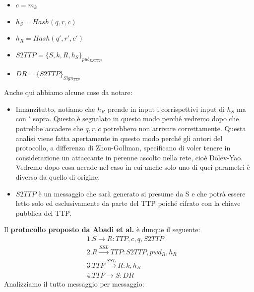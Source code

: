 \begin{itemize}
    \item $c= m_k$ 
    \item $h_S = Hash(q,r,c)$
    \item $h_R = Hash(q',r',c')$
    \item $S2TTP = \{S,k,R,h_S\}_{pub_{EK TTP}}$
    \item $DR = \{S2TTP\}_{Sign_{TTP}}$ 
\end{itemize}
Anche qui abbiamo alcune cose da notare:
\begin{itemize}
    \item Innanzitutto, notiamo che $h_R$ prende in input i corrispettivi input di $h_S$ ma con $'$ sopra. Questo è segnalato in questo modo perché vedremo dopo che potrebbe accadere che $q,r,c$ potrebbero non arrivare correttamente. Questa analisi viene fatta apertamente in questo modo perché gli autori del protocollo, a differenza di Zhou-Gollman, specificano di voler tenere in considerazione un attaccante in perenne ascolto nella rete, cioè Dolev-Yao. Vedremo dopo cosa accade nel caso in cui anche solo uno di quei parametri è diverso da quello di origine.
    \item $S2TTP$ è un messaggio che sarà generato si presume da S e che potrà essere letto solo ed esclusivamente da parte del TTP poiché cifrato con la chiave pubblica del TTP. 
\end{itemize}
Il \textbf{protocollo proposto da Abadi et al.} è dunque il seguente:
\begin{align*}
    &1. S \to R: TTP, c, q,  S2TTP\\
    &2. R \xrightarrow{SSL} TTP: S2TTP, pwd_R, h_R\\
    &3. TTP \xrightarrow{SSL} R: k, h_R\\
    &4. TTP \to S: DR
\end{align*}
Analizziamo il tutto messaggio per messaggio:
